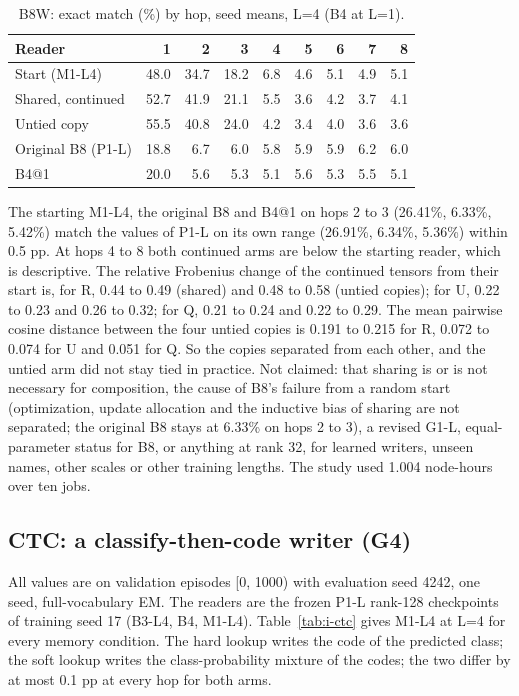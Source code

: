 \begin{table}[htbp]
\centering\footnotesize
\caption{B8W: exact match (\%) by hop, seed means, L=4 (B4 at L=1).  %
}
\label{tab:i-b8w-hop}
\begin{tabular}{@{}lrrrrrrrr@{}}
\toprule
Reader & 1 & 2 & 3 & 4 & 5 & 6 & 7 & 8 \\
\midrule
Start (M1-L4) & 48.0 & 34.7 & 18.2 & 6.8 & 4.6 & 5.1 & 4.9 & 5.1 \\
Shared, continued & 52.7 & 41.9 & 21.1 & 5.5 & 3.6 & 4.2 & 3.7 & 4.1 \\
Untied copy & 55.5 & 40.8 & 24.0 & 4.2 & 3.4 & 4.0 & 3.6 & 3.6 \\
Original B8 (P1-L) & 18.8 & 6.7 & 6.0 & 5.8 & 5.9 & 5.9 & 6.2 & 6.0 \\
B4@1 & 20.0 & 5.6 & 5.3 & 5.1 & 5.6 & 5.3 & 5.5 & 5.1 \\
\bottomrule
\end{tabular}
\end{table}

The starting M1-L4, the original B8 and B4@1 on hops 2 to 3 (26.41\%, 6.33\%, 5.42\%) match the values of P1-L on its own range (26.91\%, 6.34\%, 5.36\%) within 0.5 pp.
At hops 4 to 8 both continued arms are below the starting reader, which is descriptive.  %
The relative Frobenius change of the continued tensors from their start is, for R, 0.44 to 0.49 (shared) and 0.48 to 0.58 (untied copies); for U, 0.22 to 0.23 and 0.26 to 0.32; for Q, 0.21 to 0.24 and 0.22 to 0.29.
The mean pairwise cosine distance between the four untied copies is 0.191 to 0.215 for R, 0.072 to 0.074 for U and 0.051 for Q.
So the copies separated from each other, and the untied arm did not stay tied in practice.  %
Not claimed: that sharing is or is not necessary for composition, the cause of B8's failure from a random start (optimization, update allocation and the inductive bias of sharing are not separated; the original B8 stays at 6.33\% on hops 2 to 3), a revised G1-L, equal-parameter status for B8, or anything at rank 32, for learned writers, unseen names, other scales or other training lengths.  %
The study used 1.004 node-hours over ten jobs.

\subsection{CTC: a classify-then-code writer (G4)}

All values are on validation episodes [0, 1000) with evaluation seed 4242, one seed, full-vocabulary EM.
The readers are the frozen P1-L rank-128 checkpoints of training seed 17 (B3-L4, B4, M1-L4).
Table~\ref{tab:i-ctc} gives M1-L4 at L=4 for every memory condition.
The hard lookup writes the code of the predicted class; the soft lookup writes the class-probability mixture of the codes; the two differ by at most 0.1 pp at every hop for both arms.  %

